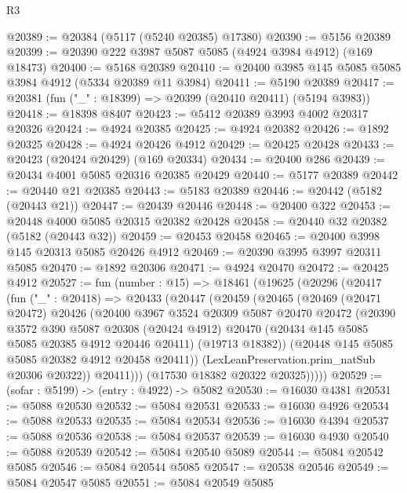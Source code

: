 \begin{lexlean}{R3}
\begin{coremodule}
@20389 := @20384 (@5117 (@5240 @20385) @17380)
@20390 := @5156 @20389
@20399 := @20390 @222 @3987 @5087 @5085 (@4924 @3984 @4912) (@169 @18473)
@20400 := @5168 @20389
@20410 := @20400 @3985 @145 @5085 @5085 @3984 @4912 (@5334 @20389 @11 @3984)
@20411 := @5190 @20389
@20417 := @20381 (fun ("_" : @18399) => @20399 (@20410 @20411) (@5194 @3983))
@20418 := @18398 @8407
@20423 := @5412 @20389 @3993 @4002 @20317 @20326
@20424 := @4924 @20385
@20425 := @4924 @20382
@20426 := @1892 @20325
@20428 := @4924 @20426 @4912
@20429 := @20425 @20428
@20433 := @20423 (@20424 @20429) (@169 @20334)
@20434 := @20400 @286
@20439 := @20434 @4001 @5085 @20316 @20385 @20429
@20440 := @5177 @20389
@20442 := @20440 @21 @20385
@20443 := @5183 @20389
@20446 := @20442 (@5182 (@20443 @21))
@20447 := @20439 @20446
@20448 := @20400 @322
@20453 := @20448 @4000 @5085 @20315 @20382 @20428
@20458 := @20440 @32 @20382 (@5182 (@20443 @32))
@20459 := @20453 @20458
@20465 := @20400 @3998 @145 @20313 @5085 @20426 @4912
@20469 := @20390 @3995 @3997 @20311 @5085
@20470 := @1892 @20306
@20471 := @4924 @20470
@20472 := @20425 @4912
@20527 := fun (number : @15) =>
  @18461
    (@19625
      (@20296
        (@20417
          (fun ("_" : @20418) =>
          @20433
            (@20447
              (@20459
                (@20465
                  (@20469
                    (@20471 @20472)
                    @20426
                    (@20400
                      @3967
                      @3524
                      @20309
                      @5087
                      @20470
                      @20472
                      (@20390
                        @3572
                        @390
                        @5087
                        @20308
                        (@20424 @4912)
                        @20470
                        (@20434 @145 @5085 @5085 @20385 @4912 @20446 @20411)
                        (@19713 @18382))
                      (@20448 @145 @5085 @5085 @20382 @4912 @20458 @20411))
                    (LexLeanPreservation.prim_natSub @20306 @20322))
                  @20411)))
            (@17530 @18382 @20322 @20325)))))
@20529 := (sofar : @5199) -> (entry : @4922) -> @5082
@20530 := @16030 @4381
@20531 := @5088 @20530
@20532 := @5084 @20531
@20533 := @16030 @4926
@20534 := @5088 @20533
@20535 := @5084 @20534
@20536 := @16030 @4394
@20537 := @5088 @20536
@20538 := @5084 @20537
@20539 := @16030 @4930
@20540 := @5088 @20539
@20542 := @5084 @20540 @5089
@20544 := @5084 @20542 @5085
@20546 := @5084 @20544 @5085
@20547 := @20538 @20546
@20549 := @5084 @20547 @5085
@20551 := @5084 @20549 @5085

\end{coremodule}
\end{lexlean}
